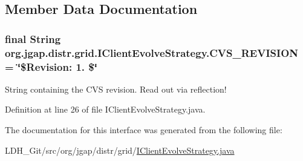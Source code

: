 \subsection{Member Data Documentation}
\hypertarget{interfaceorg_1_1jgap_1_1distr_1_1grid_1_1_i_client_evolve_strategy_a706bdddddffc00f62303ebaea63d3e35}{
\subsubsection[{C\-V\-S\-\_\-\-R\-E\-V\-I\-S\-I\-O\-N}]{\setlength{\rightskip}{0pt plus 5cm}final String org.\-jgap.\-distr.\-grid.\-I\-Client\-Evolve\-Strategy.\-C\-V\-S\-\_\-\-R\-E\-V\-I\-S\-I\-O\-N = \char`\"{}\$Revision\-: 1. \$\char`\"{}\hspace{0.3cm}{\ttfamily [static]}}}\label{interfaceorg_1_1jgap_1_1distr_1_1grid_1_1_i_client_evolve_strategy_a706bdddddffc00f62303ebaea63d3e35}
String containing the C\-V\-S revision. Read out via reflection! 

Definition at line 26 of file I\-Client\-Evolve\-Strategy.\-java.



The documentation for this interface was generated from the following file\-:\begin{DoxyCompactItemize}
\item 
L\-D\-H\-\_\-\-Git/src/org/jgap/distr/grid/\hyperlink{_i_client_evolve_strategy_8java}{I\-Client\-Evolve\-Strategy.\-java}\end{DoxyCompactItemize}
